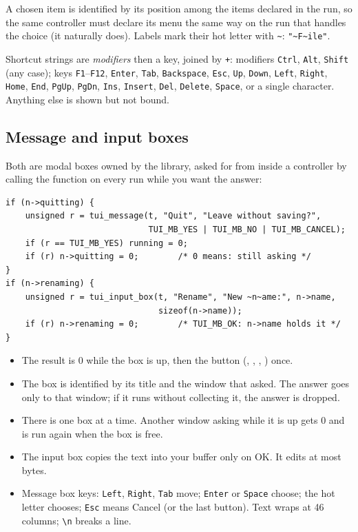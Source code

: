 \documentclass[11pt,a4paper]{article}
\newcommand{\fn}[1]{\texttt{\detokenize{#1}}}
\newcommand{\key}[1]{\texttt{#1}}
\newcommand{\bs}{\textbackslash}
\begin{document}
A chosen item is identified by its position among the items declared in the
run, so the same controller must declare its menu the same way on the run
that handles the choice (it naturally does). Labels mark their hot letter with
\texttt{\textasciitilde}: \texttt{"\textasciitilde F\textasciitilde ile"}.

Shortcut strings are \emph{modifiers} then a key, joined by \texttt{+}:
modifiers \texttt{Ctrl}, \texttt{Alt}, \texttt{Shift} (any case); keys
\texttt{F1}--\texttt{F12}, \texttt{Enter}, \texttt{Tab}, \texttt{Backspace},
\texttt{Esc}, \texttt{Up}, \texttt{Down}, \texttt{Left}, \texttt{Right},
\texttt{Home}, \texttt{End}, \texttt{PgUp}, \texttt{PgDn}, \texttt{Ins},
\texttt{Insert}, \texttt{Del}, \texttt{Delete}, \texttt{Space}, or a single
character. Anything else is shown but not bound.

\subsection{Message and input boxes}

Both are modal boxes owned by the library, asked for from inside a controller
by calling the function on every run while you want the answer:

\begin{lstlisting}
if (n->quitting) {
    unsigned r = tui_message(t, "Quit", "Leave without saving?",
                             TUI_MB_YES | TUI_MB_NO | TUI_MB_CANCEL);
    if (r == TUI_MB_YES) running = 0;
    if (r) n->quitting = 0;        /* 0 means: still asking */
}
if (n->renaming) {
    unsigned r = tui_input_box(t, "Rename", "New ~n~ame:", n->name,
                               sizeof(n->name));
    if (r) n->renaming = 0;        /* TUI_MB_OK: n->name holds it */
}
\end{lstlisting}

\begin{itemize}
\item The result is 0 while the box is up, then the button
  (\fn{TUI_MB_OK}, \fn{YES}, \fn{NO}, \fn{CANCEL}) once.
\item The box is identified by its title and the window that asked. The answer
  goes only to that window; if it runs without collecting it, the answer is
  dropped.
\item There is one box at a time. Another window asking while it is up gets 0
  and is run again when the box is free.
\item The input box copies the text into your buffer only on OK. It edits at
  most \fn{R2_TUI_INPUT_MAX} bytes.
\item Message box keys: \key{Left}, \key{Right}, \key{Tab} move; \key{Enter} or
  \key{Space} choose; the hot letter chooses; \key{Esc} means Cancel (or the
  last button). Text wraps at 46 columns; \texttt{\bs n} breaks a line.
\end{itemize}
\end{document}
